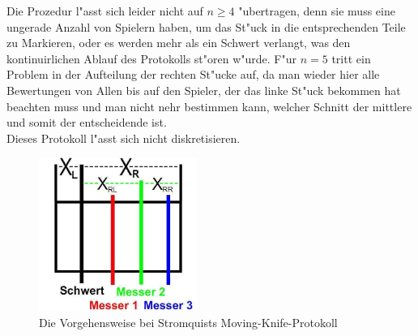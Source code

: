 \documentclass[11pt, a4paper, twoside]{article}
\newcommand{\wf}{\color{white}}
\newtheorem{bsp}[satz]{Beispiel}
\numberwithin{equation}{section}
\begin{document}
Die Prozedur l"asst sich leider nicht auf $n \geq 4$ "ubertragen, denn sie muss eine ungerade Anzahl von Spielern haben, um das St"uck in die entsprechenden Teile zu Markieren, oder es werden mehr als ein Schwert verlangt, was den kontinuirlichen Ablauf des Protokolls st"oren w"urde. F"ur $n=5$ tritt ein Problem in der Aufteilung der rechten St"ucke auf, da man wieder hier alle Bewertungen von Allen bis auf den Spieler, der das linke  St"uck bekommen hat beachten muss und man nicht nehr bestimmen kann, welcher Schnitt der mittlere und somit der entscheidende ist.\\ Dieses Protokoll l"asst sich nicht diskretisieren.
\begin{figure}[h!]
\center
\includegraphics[height=5cm]{str.jpg}
\caption[Vorgehensweise bei Stromquists Moving-Knife-Protokoll]{Die Vorgehensweise bei Stromquists Moving-Knife-Protokoll}
\end{figure}
\end{document}
